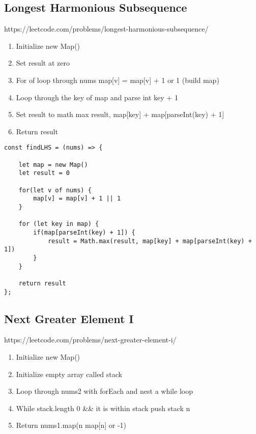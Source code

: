 \documentclass[10pt]{article}
\begin{document}
\pagebreak %
\medskip   
\subsection{Longest Harmonious Subsequence}
https://leetcode.com/problems/longest-harmonious-subsequence/

\begin{enumerate}
	\item Initialize new Map()
	\item Set result at zero 
	\item For of loop through nums map[v] = map[v] + 1 or 1 (build map)
	\item Loop through the key of map and parse int key + 1
	\item Set result to math max result, map[key] + map[parseInt(key) + 1]
	\item Return result
	
\end{enumerate}

\begin{lstlisting}[title=Solution findLHS, captionpos=t]
const findLHS = (nums) => {
    
    let map = new Map() 
    let result = 0
    
    for(let v of nums) {
        map[v] = map[v] + 1 || 1
    }
    
    for (let key in map) {
        if(map[parseInt(key) + 1]) {
            result = Math.max(result, map[key] + map[parseInt(key) + 1])
        }
    }
    
    return result
};
\end{lstlisting}

\medskip %





\pagebreak %
\medskip   
\subsection{Next Greater Element I}
https://leetcode.com/problems/next-greater-element-i/

\begin{enumerate}
	\item Initialize new Map()
	\item Initialize empty array called stack 
	\item Loop through nums2 with forEach and nest a while loop
	\item While stack.length  0 \&\& it is within stack push stack n 
	\item Return nums1.map(n map[n] or -1)
\end{enumerate}
\end{document}
